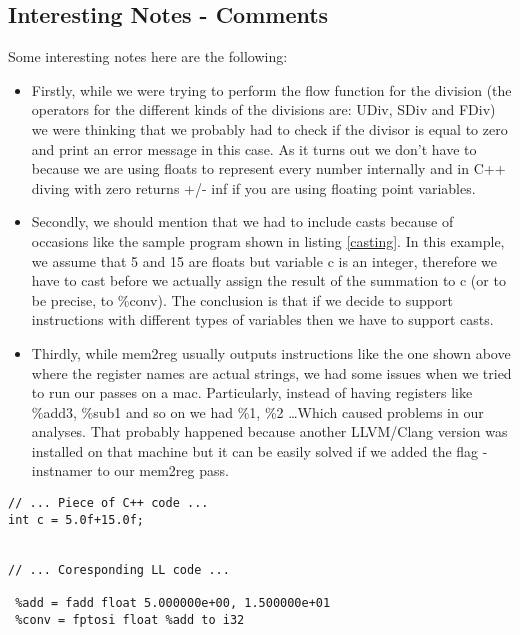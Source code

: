 \subsection*{Interesting Notes - Comments}
Some interesting notes here are the following:



\begin{itemize}

  \item Firstly, while we were trying to perform the flow function for the division (the operators for the different kinds of the divisions are: UDiv, SDiv and FDiv) we were thinking that we probably had to check if the divisor is equal to zero and print an error message in this case. As it turns out we don't have to because we are using floats to represent every number internally and in C++ diving with zero returns +/- inf if you are using floating point variables.
  \item Secondly, we should mention that we had to include casts because of occasions like the sample program shown in listing \ref{casting}. In this example, we assume that 5 and 15 are floats but variable c is an integer, therefore we have to cast before we actually assign the result of the summation to c (or to be precise, to \%conv). The conclusion is that if we decide to support instructions with different types of variables then we have to support casts.
  
  \item Thirdly, while mem2reg usually outputs instructions like the one shown above where the register names are actual strings, we had some issues when we tried to run our passes on a mac. Particularly, instead of having registers like \%add3, \%sub1 and so on we had \%1, \%2 \ldots Which caused problems in our analyses. That probably happened because another LLVM/Clang version was installed on that machine but it can be easily solved if we added the flag -instnamer to our mem2reg pass.

\end{itemize}


\begin{lstlisting}[caption=value preservation inside casts, label=casting]
// ... Piece of C++ code ...
int c = 5.0f+15.0f;


// ... Coresponding LL code ...

 %add = fadd float 5.000000e+00, 1.500000e+01
 %conv = fptosi float %add to i32

\end{lstlisting}







  